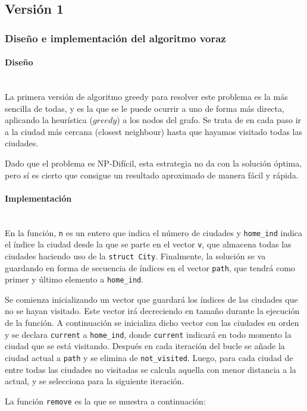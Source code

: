 \documentclass{article}
\newcommand{\myparagraph}[1]{\paragraph{#1}\mbox{}\\}
\begin{document}
\subsection{Versión 1}
\subsubsection{Diseño e implementación del algoritmo voraz}
\myparagraph{Diseño}

La primera versión de algoritmo greedy para resolver este problema es la más sencilla de todas, y es la que se le puede ocurrir a uno de forma más directa, aplicando la heurística ($greedy$) a los nodos del grafo. Se trata de en cada paso ir a la ciudad más cercana (closest neighbour) hasta que hayamos visitado todas las ciudades.

Dado que el problema es NP-Difícil, esta estrategia no da con la solución óptima, pero sí es cierto que consigue un resultado aproximado de manera fácil y rápida.

\myparagraph{Implementación}


En la función, \verb|n| es un entero que indica el número de ciudades y \verb|home_ind| indica el índice la ciudad desde la que se parte en el vector \verb|v|, que almacena todas las ciudades haciendo uso de la \verb|struct City|. Finalmente, la solución se va guardando en forma de secuencia de índices en el vector \verb|path|, que tendrá como primer y último elemento a \verb|home_ind|.

\vspace{0.5cm}

Se comienza inicializando un vector que guardará los índices de las ciudades que no se hayan visitado. Este vector irá decreciendo en tamaño durante la ejecución de la función. A continuación se inicializa dicho vector con las ciudades en orden y se declara \verb|current| a \verb|home_ind|, donde \verb|current| indicará en todo momento la ciudad que se está visitando. Después en cada iteración del bucle se añade la ciudad actual a \verb|path| y se elimina de \verb|not_visited|. Luego, para cada ciudad de entre todas las ciudades no visitadas se calcula aquella con menor distancia a la actual, y se selecciona para la siguiente iteración.

\vspace{0.5cm}

La función \verb|remove| es la que se muestra a continuación:
\end{document}
